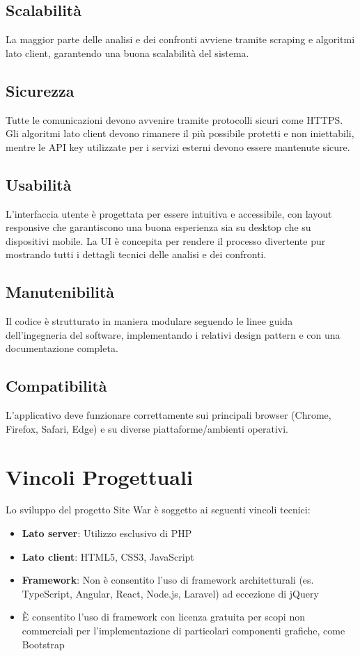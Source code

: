 \subsection{Scalabilità}
La maggior parte delle analisi e dei confronti avviene tramite scraping e algoritmi lato client, garantendo una buona scalabilità del sistema.

\subsection{Sicurezza}
Tutte le comunicazioni devono avvenire tramite protocolli sicuri come HTTPS. Gli algoritmi lato client devono rimanere il più possibile protetti e non iniettabili, mentre le API key utilizzate per i servizi esterni devono essere mantenute sicure.

\subsection{Usabilità}
L'interfaccia utente è progettata per essere intuitiva e accessibile, con layout responsive che garantiscono una buona esperienza sia su desktop che su dispositivi mobile. La UI è concepita per rendere il processo divertente pur mostrando tutti i dettagli tecnici delle analisi e dei confronti.

\subsection{Manutenibilità}
Il codice è strutturato in maniera modulare seguendo le linee guida dell'ingegneria del software, implementando i relativi design pattern e con una documentazione completa.

\subsection{Compatibilità}
L'applicativo deve funzionare correttamente sui principali browser (Chrome, Firefox, Safari, Edge) e su diverse piattaforme/ambienti operativi.

\section{Vincoli Progettuali}
Lo sviluppo del progetto Site War è soggetto ai seguenti vincoli tecnici:

\begin{itemize}
    \item \textbf{Lato server}: Utilizzo esclusivo di PHP
    \item \textbf{Lato client}: HTML5, CSS3, JavaScript
    \item \textbf{Framework}: Non è consentito l'uso di framework architetturali (es. TypeScript, Angular, React, Node.js, Laravel) ad eccezione di jQuery
    \item È consentito l'uso di framework con licenza gratuita per scopi non commerciali per l'implementazione di particolari componenti grafiche, come Bootstrap
\end{itemize}

